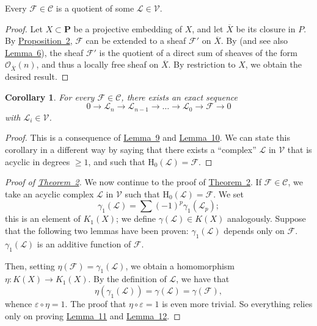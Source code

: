 \documentclass{article}
\theoremstyle{plain}
\newenvironment{lemma}[1]
    {\renewcommand\theinnerlemma{#1}\innerlemma}
    {\endinnerlemma}
\newtheorem*{corollary}{Corollary}
\theoremstyle{definition}
\newcommand{\scr}[1]{{\mathscr{#1}}}
\renewcommand{\cal}[1]{{\mathcal{#1}}}
\newcommand{\HH}{\mathrm{H}}
\newcommand{\PP}{\mathbf{P}}
\renewcommand{\geq}{\geqslant}
\newcommand{\oldpage}[1]{\marginpar{\footnotesize$\Big\vert$ \textit{p.~#1}}}
\begin{document}
\begin{lemma}{10}
\label{lemma10}
  Every $\scr{F}\in\cal{C}$ is a quotient of some $\scr{L}\in\cal{V}$.
\end{lemma}

\begin{proof}
  Let $X\subset \PP$ be a projective embedding of $X$, and let $\overline{X}$ be its closure in $P$.
  By \hyperref[proposition2]{Proposition~2}, $\scr{F}$ can be extended to a sheaf $\scr{F}'$ on $\overline{X}$.
  By \cite[th\'{e}or\`{e}me~1, p.~247]{12} (and see also \hyperref[lemma6]{Lemma~6}), the sheaf $\scr{F}'$ is the quotient of a direct sum of sheaves of the form $\scr{O}_{\overline{X}}(n)$, and thus a locally free sheaf on $\overline{X}$.
  By restriction to $X$, we obtain the desired result.
\end{proof}

\begin{corollary}
  For every $\scr{F}\in\cal{C}$, there exists an exact sequence
  \[
    0\to\scr{L}_n\to\scr{L}_{n-1}\to\ldots\to\scr{L}_0\to\scr{F}\to0
  \]
  with $\scr{L}_i\in\cal{V}$.
\end{corollary}

\begin{proof}
  This is a consequence of \hyperref[lemma9]{Lemma~9} and \hyperref[lemma10]{Lemma~10}.
  We can state this corollary in a different way by saying that there exists a ``complex'' $\scr{L}$ in $\cal{V}$ that is acyclic in degrees $\geq1$, and such that $\HH_0(\scr{L})=\scr{F}$.
\end{proof}

\begin{proof}[Proof of {\hyperref[theorem2]{Theorem~2}}]
  We now continue to the proof of \hyperref[theorem2]{Theorem~2}.
  If $\scr{F}\in\cal{C}$, we take an acyclic complex $\scr{L}$ in $\cal{V}$ such that $\HH_0(\scr{L})=\scr{F}$.
  We set
  \[
    \gamma_1(\scr{L}) = \sum(-1)^p\gamma_1(\scr{L}_p);
  \]
  this is an element of $K_1(X)$;
  we define $\gamma(\scr{L})\in K(X)$ analogously.
  Suppose that the following two lemmas have been proven:
  \begin{lemma}{11}
  \label{lemma11}
    $\gamma_1(\scr{L})$ depends only on $\scr{F}$.
  \end{lemma}
  \begin{lemma}{12}
  \label{lemma12}
    $\gamma_1(\scr{L})$ is an additive function of $\scr{F}$.
  \end{lemma}

  Then, setting $\eta(\scr{F})=\gamma_1(\scr{L})$, we obtain a homomorphism $\eta\colon K(X)\to K_1(X)$.
  By the definition of $\scr{L}$, we have that
  \[
    \eta(\gamma_1(\scr{L})) = \gamma(\scr{L}) = \gamma(\scr{F}),
  \]
  whence $\varepsilon\circ\eta=1$.
  \oldpage{107}
  The proof that $\eta\circ\varepsilon=1$ is even more trivial.
  So everything relies only on proving \hyperref[lemma11]{Lemma~11} and \hyperref[lemma12]{Lemma~12}.
\end{proof}
\end{document}
